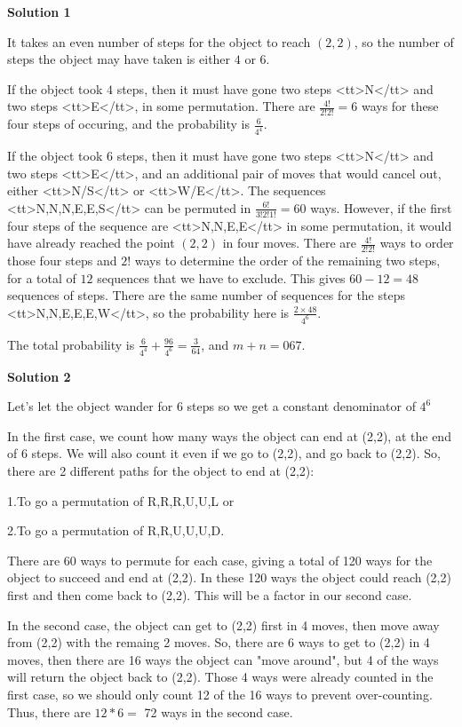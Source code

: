\begin{enumerate}
\textbf{Solution 1}

It takes an even number of steps for the object to reach $(2,2)$, so the number of steps the object may have taken is either $4$ or $6$.

 If the object took $4$ steps, then it must have gone two steps <tt>N</tt> and two steps <tt>E</tt>, in some permutation. There are $\frac{4!}{2!2!} = 6$ ways for these four steps of occuring, and the probability is $\frac{6}{4^{4}}$.

 If the object took $6$ steps, then it must have gone two steps <tt>N</tt> and two steps <tt>E</tt>, and an additional pair of moves that would cancel out, either <tt>N/S</tt> or <tt>W/E</tt>. The sequences <tt>N,N,N,E,E,S</tt> can be permuted in $\frac{6!}{3!2!1!} = 60$ ways. However, if the first four steps of the sequence are <tt>N,N,E,E</tt> in some permutation, it would have already reached the point $(2,2)$ in four moves. There are $\frac{4!}{2!2!}$ ways to order those four steps and $2!$ ways to determine the order of the remaining two steps, for a total of $12$ sequences that we have to exclude. This gives $60-12=48$ sequences of steps. There are the same number of sequences for the steps <tt>N,N,E,E,E,W</tt>, so the probability here is $\frac{2 \times 48}{4^6}$.

 The total probability is $\frac{6}{4^4} + \frac{96}{4^6} = \frac{3}{64}$, and $m+n= \boxed{067}$.

 



\textbf{Solution 2}

Let's let the object wander for 6 steps so we get a constant denominator of $4^{6}$

 In the first case, we count how many ways the object can end at (2,2), at the end of 6 steps. We will also count it even if we go to (2,2), and go back to (2,2). So, there are 2 different paths for the object to end at (2,2): 

 1.To go a permutation of R,R,R,U,U,L or 

 2.To go a permutation of R,R,U,U,U,D. 

 There are 60 ways to permute for each case, giving a total of 120 ways for the object to succeed and end at (2,2). In these 120 ways the object could reach (2,2) first and then come back to (2,2). This will be a factor in our second case.

 In the second case, the object can get to (2,2) first in 4 moves, then move away from (2,2) with the remaing 2 moves. So, there are 6 ways to get to (2,2) in 4 moves, then there are 16 ways the object can "move around", but 4 of the ways will return the object back to (2,2). Those 4 ways were already counted in the first case, so we should only count 12 of the 16 ways to prevent over-counting. Thus, there are $12*6 =$ 72 ways in the second case.


\end{enumerate}
